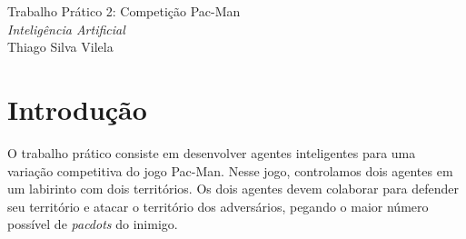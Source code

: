 \documentclass[a4paper,12pt]{article}
\begin{document}





\newpage
\begin{center}
 {\LARGE  Trabalho Prático 2: Competição Pac-Man\\}
 {\Large \it Inteligência Artificial\\}
 {\Large Thiago Silva Vilela\\}
\end{center}
\vspace{1cm}

\section{Introdução}

O trabalho prático consiste em desenvolver agentes inteligentes para uma variação
competitiva do jogo Pac-Man. Nesse jogo, controlamos dois agentes em um labirinto
com dois territórios. Os dois agentes devem colaborar para defender seu território
e atacar o território dos adversários, pegando o maior número possível de
\textit{pacdots} do inimigo.
\end{document}
